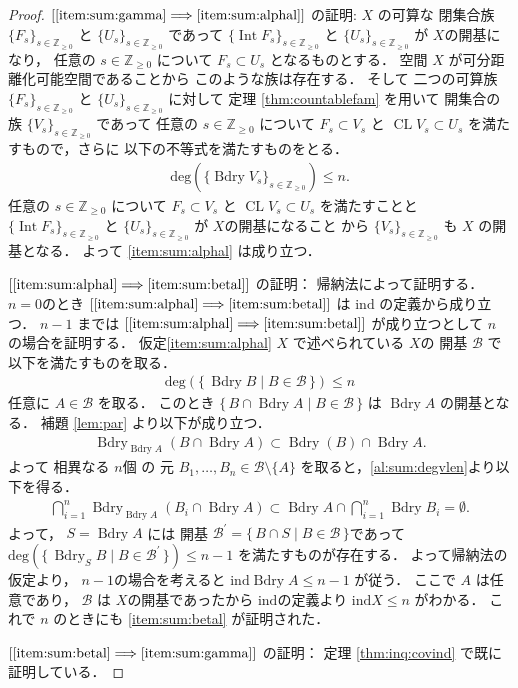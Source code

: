 \documentclass[leqno, a4paper, 12pt]{jsarticle}
\theoremstyle{plain}
\theoremstyle{definition}
\theoremstyle{remark}
\newcommand{\To}{\Longrightarrow}
\newcommand{\zz}{\mathbb{Z}}
\DeclareMathOperator{\bd}{\mathrm{Bdry}}
\DeclareMathOperator{\cl}{\mathrm{CL}}
\DeclareMathOperator{\nai}{\mathrm{Int}}
\newcommand{\yoind}{\mathrm{ind}}
\newcommand{\yodeg}{\mathrm{deg}}
\numberwithin{equation}{section}
\begin{document}
\begin{proof}
$[\ref{item:sum:gamma}\To \ref{item:sum:alphal}]$
の証明:
$X$
の可算な
閉集合族
$\{F_{s}\}_{s \in \zz_{\ge 0}}$
と
$\{U_{s}\}_{s\in \zz_{\ge 0}}$
であって
$\{\nai F_{s}\}_{s\in \zz_{\ge 0}}$
と
$\{U_{s}\}_{s\in \zz_{\ge 0}}$
が
$X$の開基になり，
任意の
$s\in \zz_{\ge 0}$
について
$F_{s}\subset U_{s}$
となるものとする．
空間
$X$
が可分距離化可能空間であることから
このような族は存在する．
そして
二つの可算族
$\{F_{s}\}_{s\in \zz_{\ge 0}}$
と
$\{U_{s}\}_{s\in \zz_{\ge 0}}$
に対して
定理
\ref{thm:countablefam}
を用いて
開集合の族
$\{V_{s}\}_{s\in \zz_{\ge 0}}$
であって
任意の
$s\in \zz_{\ge 0}$
について
$F_{s}\subset V_{s}$
と
$\cl V_{s}\subset U_{s}$
を満たすもので，さらに
以下の不等式を満たすものをとる．
\begin{align}
\yodeg(\{\bd V_{s}\}_{s\in \zz_{\ge 0}})\le n. 
\end{align}
任意の
$s\in \zz_{\ge 0}$
について
$F_{s}\subset V_{s}$
と
$\cl V_{s}\subset U_{s}$
を満たすことと
$\{\nai F_{s}\}_{s\in \zz_{\ge 0}}$
と
$\{U_{s}\}_{s\in \zz_{\ge 0}}$
が
$X$の開基になること
から
$\{V_{s}\}_{s\in \zz_{\ge 0}}$
も
$X$
の開基となる．
よって
\ref{item:sum:alphal}
は成り立つ．




$[\ref{item:sum:alphal} \To \ref{item:sum:betal}]$
の証明：
帰納法によって証明する．
$n=0$のとき
$[\ref{item:sum:alphal} \To \ref{item:sum:betal}]$
は
$\yoind$
の定義から成り立つ．
$n-1$
までは
$[\ref{item:sum:alphal} \To \ref{item:sum:betal}]$
が成り立つとして
$n$
の場合を証明する．
仮定\ref{item:sum:alphal}
$X$
で述べられている
$X$の
開基
$\mathcal{B}$
で以下を満たすものを取る．
\begin{align}\label{al:sum:degvlen}
\yodeg(\{\, \bd B\mid B\in \mathcal{B}\, \})\le n
\end{align}
任意に
$A\in \mathcal{B}$
を取る．
このとき
$\{\, B\cap \bd A \mid B\in \mathcal{B}\, \}$
は
$\bd A$
の開基となる．
補題
\ref{lem:par}
より以下が成り立つ．
\begin{align}
\bd_{\bd A}(B\cap \bd A)\subset \bd(B)\cap \bd A. 
\end{align}
よって
相異なる
$n$個
の
元
$B_{1}, \dots, B_{n}\in \mathcal{B}\setminus \{A\}$
を取ると，\eqref{al:sum:degvlen}より以下を得る．
\begin{align}
\bigcap_{i=1}^{n}\bd_{\bd A}(B_{i}\cap \bd A)
\subset \bd A\cap \bigcap_{i=1}^{n}\bd B_{i}=\emptyset. 
\end{align}
よって，
$S=\bd A$
には
開基
$\mathcal{B}^{\prime}=\{\, B\cap S \mid B\in \mathcal{B}\, \}$であって
$\yodeg(\{\, \bd_{S}B\mid B\in \mathcal{B}^{\prime}\, \})\le n-1$
を満たすものが存在する．
よって帰納法の仮定より，
$n-1$の場合を考えると
$\yoind \bd A\le n-1$
が従う．
ここで
$A$
は任意であり，
$\mathcal{B}$
は
$X$の開基であったから
$\yoind$の定義より
$\yoind X\le n$
がわかる．
これで
$n$
のときにも
\ref{item:sum:betal}
が証明された．




$[\ref{item:sum:betal}\To \ref{item:sum:gamma}]$
の証明：
定理
\ref{thm:inq:covind}
で既に証明している．
\end{proof}
\end{document}
